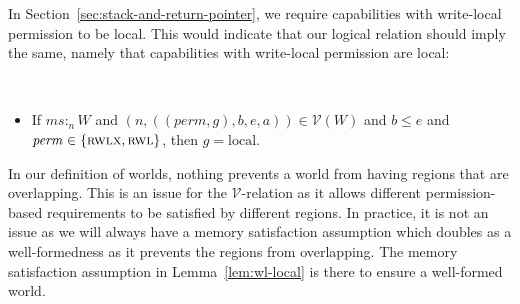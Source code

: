 \documentclass[format=acmsmall, review=true, screen=true]{acmart}
\renewcommand{\sectionname}{Section}
\newcommand{\var}[1]{\mathit{#1}}
\newcommand{\hs}{\var{ms}}
\newcommand{\ms}{\hs}
\newcommand{\gl}{\var{g}}
\newcommand{\addr}{\var{a}}
\newcommand{\start}{\var{b}}
\newcommand{\addrend}{\var{e}}
\newcommand{\heap}{\var{mem}}
\newcommand{\perm}{\var{perm}}
\newcommand{\stdcap}[1][(\perm,\gl)]{\left(#1,\start,\addrend,\addr \right)}
\newcommand{\heapSat}[3][\heap]{#1 :_{#2} #3}
\newcommand{\memSat}[3][n]{\heapSat[#2]{#1}{#3}}
\newcommand{\asmType}{\plaindom{AsmType}}
\newcommand{\plaindom}[1]{\mathrm{#1}}
\newcommand{\intr}[2]{\mathcal{#1}}
\newcommand{\valueintr}[1]{\intr{V}{#1}}
\newcommand{\stdvr}{\valueintr{\asmType}}
\newcommand{\npair}[2][n]{\left(#1,#2 \right)}
\newcommand{\plainperm}[1]{\textsc{#1}}
\newcommand{\readwritel}{\plainperm{rwl}}
\newcommand{\rwl}{\readwritel}
\newcommand{\rwlx}{\plainperm{rwlx}}
\newcommand{\plainlocality}[1]{\mathrm{#1}}
\newcommand{\local}{\plainlocality{local}}
\newenvironment{toplas}{}{}
\begin{document}
\begin{toplas}
  In \sectionname~\ref{sec:stack-and-return-pointer}, we require capabilities with write-local permission to be local.
  This would indicate that our logical relation should imply the same, namely that capabilities with write-local permission are local:
  \begin{lemma}~
    \label{lem:wl-local}
    \begin{itemize}
    \item If $\memSat{\ms}{W}$ and $\npair{\stdcap} \in \stdvr(W)$ and $\start
      \leq \addrend$ and $\perm \in \{\rwlx,\rwl\}$, then $\gl = \local$.
    \end{itemize}
  \end{lemma}
  In our definition of worlds, nothing prevents a world from having regions that are overlapping.
  This is an issue for the $\stdvr$-relation as it allows different permission-based requirements to be satisfied by different regions.
  In practice, it is not an issue as we will always have a memory satisfaction assumption which doubles as a well-formedness as it prevents the regions from overlapping.
  The memory satisfaction assumption in Lemma~\ref{lem:wl-local} is there to ensure a well-formed world.
\end{toplas}
\end{document}
